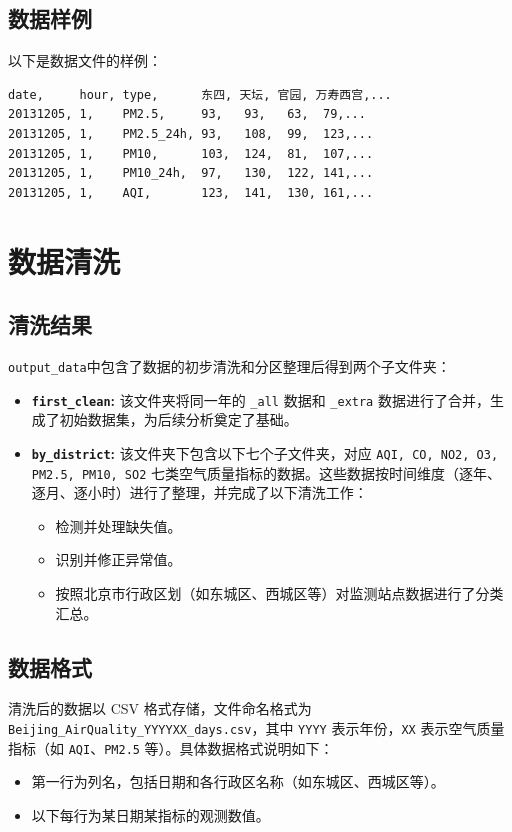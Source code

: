 \documentclass[12pt, a4paper, oneside]{ctexart}
\begin{document}
\subsection{数据样例}
以下是数据文件的样例：  
\begin{verbatim}
date,     hour, type,      东四, 天坛, 官园, 万寿西宫,...
20131205, 1,    PM2.5,     93,   93,   63,  79,...
20131205, 1,    PM2.5_24h, 93,   108,  99,  123,...
20131205, 1,    PM10,      103,  124,  81,  107,...
20131205, 1,    PM10_24h,  97,   130,  122, 141,...
20131205, 1,    AQI,       123,  141,  130, 161,...
\end{verbatim}
\section{数据清洗}
\subsection{清洗结果}  
\texttt{output\_data}中包含了数据的初步清洗和分区整理后得到两个子文件夹：  
\begin{itemize}
    \item \textbf{\texttt{first\_clean}:}  
    该文件夹将同一年的 \texttt{\_all} 数据和 \texttt{\_extra} 数据进行了合并，生成了初始数据集，为后续分析奠定了基础。
    
    \item \textbf{\texttt{by\_district}:}  
    该文件夹下包含以下七个子文件夹，对应 \texttt{AQI, CO, NO2, O3, PM2.5, PM10, SO2} 七类空气质量指标的数据。这些数据按时间维度（逐年、逐月、逐小时）进行了整理，并完成了以下清洗工作：
    \begin{itemize}
        \item 检测并处理缺失值。
        \item 识别并修正异常值。
        \item 按照北京市行政区划（如东城区、西城区等）对监测站点数据进行了分类汇总。
    \end{itemize}
\end{itemize}

\subsection{数据格式}  
清洗后的数据以 CSV 格式存储，文件命名格式为 \texttt{Beijing\_AirQuality\_YYYYXX\_days.csv}，其中 \texttt{YYYY} 表示年份，\texttt{XX} 表示空气质量指标（如 \texttt{AQI}、\texttt{PM2.5} 等）。具体数据格式说明如下：  
\begin{itemize}
    \item 第一行为列名，包括日期和各行政区名称（如东城区、西城区等）。
    \item 以下每行为某日期某指标的观测数值。
\end{itemize}
\end{document}
